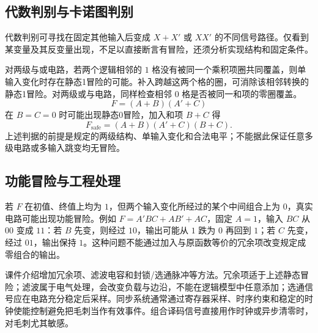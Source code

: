 \documentclass[UTF8,fontset=none,zihao=-4,a4paper]{ctexart}
\begin{document}
\subsection{代数判别与卡诺图判别}
代数判别可寻找在固定其他输入后变成 $X+X'$ 或 $XX'$ 的不同信号路径。仅看到某变量及其反变量出现，不足以直接断言有冒险，还须分析实现结构和固定条件。

对两级与或电路，若两个逻辑相邻的 $1$ 格没有被同一个乘积项圈共同覆盖，则单输入变化时存在静态1冒险的可能。补入跨越这两个格的圈，可消除该相邻转换的静态1冒险。对两级或与电路，同样检查相邻 $0$ 格是否被同一和项的零圈覆盖。
\[
F=(A+B)(A'+C)
\]
在 $B=C=0$ 时可能出现静态0冒险，加入和项 $B+C$ 得
\[
F_{\mathrm{safe}}=(A+B)(A'+C)(B+C).
\]
上述判据的前提是规定的两级结构、单输入变化和合法电平；不能据此保证任意多级电路或多输入跳变均无冒险。

\subsection{功能冒险与工程处理}
若 $F$ 在初值、终值上均为 $1$，但两个输入变化所经过的某个中间组合上为 $0$，真实电路可能出现功能冒险。例如 $F=A'BC+AB'+AC$，固定 $A=1$，输入 $BC$ 从 $00$ 变成 $11$：若 $B$ 先变，则经过 $10$，输出可能从 $1$ 跌为 $0$ 再回到 $1$；若 $C$ 先变，经过 $01$，输出保持 $1$。这种问题不能通过加入与原函数等价的冗余项改变规定成零组合的输出。

课件介绍增加冗余项、滤波电容和封锁/选通脉冲等方法。冗余项适于上述静态冒险；滤波属于电气处理，会改变负载与边沿，不能在逻辑模型中任意添加；选通信号应在电路充分稳定后采样。同步系统通常通过寄存器采样、时序约束和稳定的时钟使能控制避免把毛刺当作有效事件。组合译码信号直接用作时钟或异步清零时，对毛刺尤其敏感。
\end{document}
